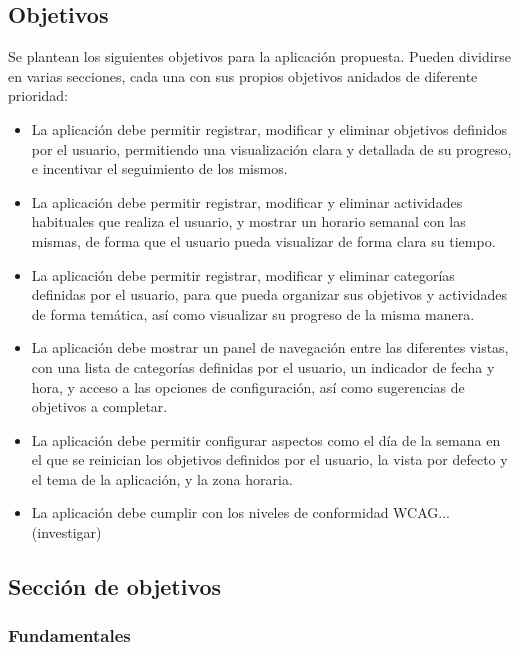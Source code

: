 \documentclass[10pt, a4paper]{aqademic}
\begin{document}
\subsection{Objetivos}

Se plantean los siguientes objetivos para la aplicación propuesta. Pueden dividirse en varias secciones, cada una con sus propios objetivos anidados de diferente prioridad:

\begin{itemize}
	\item La aplicación debe permitir registrar, modificar y eliminar objetivos definidos por el usuario, permitiendo una visualización clara y detallada de su progreso, e incentivar el seguimiento de los mismos.
	
	\item La aplicación debe permitir registrar, modificar y eliminar actividades habituales que realiza el usuario, y mostrar un horario semanal con las mismas, de forma que el usuario pueda visualizar de forma clara su tiempo.
	
	\item La aplicación debe permitir registrar, modificar y eliminar categorías definidas por el usuario, para que pueda organizar sus objetivos y actividades de forma temática, así como visualizar su progreso de la misma manera.
	
	\item La aplicación debe mostrar un panel de navegación entre las diferentes vistas, con una lista de categorías definidas por el usuario, un indicador de fecha y hora, y acceso a las opciones de configuración, así como sugerencias de objetivos a completar.
	
	\item La aplicación debe permitir configurar aspectos como el día de la semana en el que se reinician los objetivos definidos por el usuario, la vista por defecto y el tema de la aplicación, y la zona horaria.
	
	\item La aplicación debe cumplir con los niveles de conformidad WCAG... (investigar)
\end{itemize}


\subsection*{Sección de objetivos}

\subsubsection*{Fundamentales}
\end{document}
